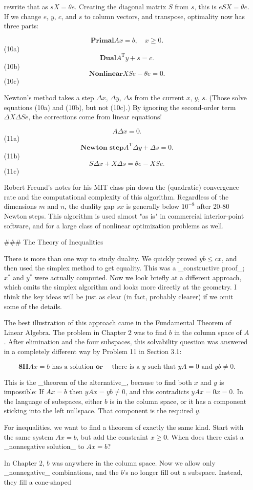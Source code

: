 rewrite that as \(sX=\theta e\). Creating the diagonal matrix \(S\) from \(s\), this is \(eSX=\theta e\). If we change \(e\), \(y\), \(c\), and \(s\) to column vectors, and transpose, optimality now has three parts:

\[\textbf{Primal} Ax=b,\quad x\geq 0.\] (10a) \[\textbf{Dual} A^{\mathrm{T}}y+s=c.\] (10b) \[\textbf{Nonlinear} XSe-\theta e=0.\] (10c)

Newton's method takes a step \(\Delta x\), \(\Delta y\), \(\Delta s\) from the current \(x\), \(y\), \(s\). (Those solve equations (10a) and (10b), but not (10c).) By ignoring the second-order term \(\Delta X\Delta Se\), the corrections come from linear equations!

\[A\Delta x=0.\] (11a) \[\textbf{Newton step} A^{\mathrm{T}}\Delta y+\Delta s=0.\] (11b) \[S\Delta x+X\Delta s=\theta e-XSe.\] (11c)

Robert Freund's notes for his MIT class pin down the (quadratic) convergence rate and the computational complexity of this algorithm. Regardless of the dimensions \(m\) and \(n\), the duality gap \(sx\) is generally below \(10^{-8}\) after 20-80 Newton steps. This algorithm is used almost "as is" in commercial interior-point software, and for a large class of nonlinear optimization problems as well.

### The Theory of Inequalities

There is more than one way to study duality. We quickly proved \(yb\leq cx\), and then used the simplex method to get equality. This was a _constructive proof_; \(x^{*}\) and \(y^{*}\) were actually computed. Now we look briefly at a different approach, which omits the simplex algorithm and looks more directly at the geometry. I think the key ideas will be just as clear (in fact, probably clearer) if we omit some of the details.

The best illustration of this approach came in the Fundamental Theorem of Linear Algebra. The problem in Chapter 2 was to find \(b\) in the column space of \(A\). After elimination and the four subspaces, this solvability question was answered in a completely different way by Problem 11 in Section 3.1:

\[\textbf{8H} Ax=b\text{ has a solution \ \ \ \ \ }\textbf{or}\quad\text{ there is a $y$ such that $yA=0$ and $yb\neq 0$.}\]

This is the _theorem of the alternative_, because to find both \(x\) and \(y\) is impossible: If \(Ax=b\) then \(yAx=yb\neq 0\), and this contradicts \(yAx=0x=0\). In the language of subspaces, either \(b\) is in the column space, or it has a component sticking into the left nullspace. That component is the required \(y\).

For inequalities, we want to find a theorem of exactly the same kind. Start with the same system \(Ax=b\), but add the constraint \(x\geq 0\). When does there exist a _nonnegative solution_ to \(Ax=b\)?

In Chapter 2, \(b\) was anywhere in the column space. Now we allow only _nonnegative_ combinations, and the \(b\)'s no longer fill out a subspace. Instead, they fill a cone-shaped 